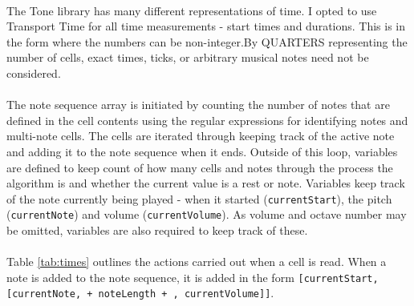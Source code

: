\paragraph{} The Tone library has many different representations of time. I opted to use Transport Time for all time measurements - start times and durations. This is in the form \texttt{} where the numbers can be non-integer.By QUARTERS representing the number of cells, exact times, ticks, or arbitrary musical notes need not be considered.

\paragraph{} The note sequence array is initiated by counting the number of notes that are defined in the cell contents using the regular expressions for identifying notes and multi-note cells. The cells are iterated through keeping track of the active note and adding it to the note sequence when it ends. Outside of this loop, variables are defined to keep count of how many cells and notes through the process the algorithm is and whether the current value is a rest or note. Variables keep track of the note currently being played - when it started (\texttt{currentStart}), the pitch (\texttt{currentNote}) and volume (\texttt{currentVolume}). As volume and octave number may be omitted, variables are also required to keep track of these. \paragraph{} Table \ref{tab:times} outlines the actions carried out when a cell is read. When a note is added to the note sequence, it is added in the form \texttt{[currentStart, [currentNote,  + noteLength + , currentVolume]]}.

